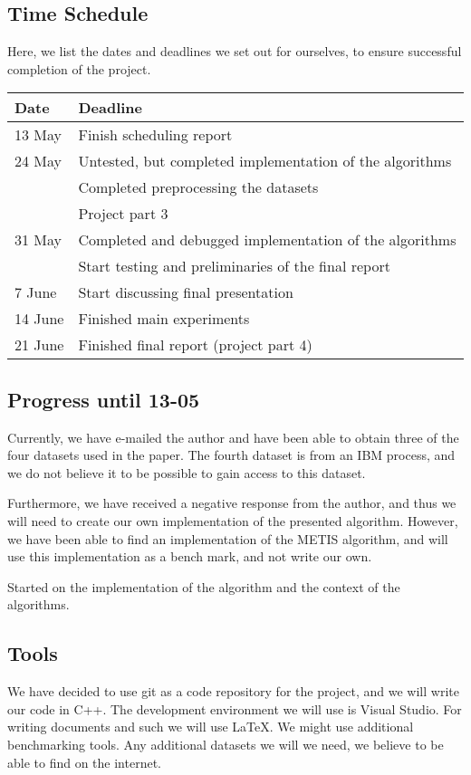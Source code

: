 \documentclass[a4paper,11pt]{article}
\begin{document}
\pagebreak
\subsection{Time Schedule}
Here, we list the dates and deadlines we set out for ourselves, to ensure successful completion of the project.

\begin{tabular}{|l|l|}
\hline
\textbf{Date}	&	\textbf{Deadline}\\
\hline
13 May	&	Finish scheduling report\\
\hline
24 May	&	Untested, but completed implementation of the algorithms\\
		&	Completed preprocessing the datasets\\
		&	Project part 3 \\
\hline
31 May	&	Completed and debugged implementation of the algorithms\\
		& 	Start testing and preliminaries of the final report\\
\hline
7 June	&	Start discussing final presentation\\
\hline
14 June	&	Finished main experiments\\
\hline
21 June	&	Finished final report (project part 4)\\
\hline
\end{tabular}

\subsection{Progress until 13-05}
Currently, we have e-mailed the author and have been able to obtain three of the four datasets used in the paper. The fourth dataset is from an IBM process, and we do not believe it to be possible to gain access to this dataset. 

Furthermore, we have received a negative response from the author, and thus we will need to create our own implementation of the presented algorithm. However, we have been able to find an implementation of the METIS algorithm, and will use this implementation as a bench mark, and not write our own. 

Started on the implementation of the algorithm and the context of the algorithms.

\subsection{Tools} 
We have decided to use git as a code repository for the project, and we will write our code in C++. The development environment we will use is Visual Studio. For writing documents and such we will use \LaTeX. We might use additional benchmarking tools. Any additional datasets we will we need, we believe to be able to find on the internet. 
\end{document}
